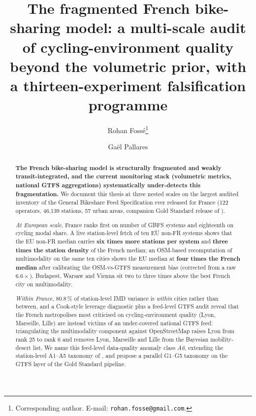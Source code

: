 \documentclass[11pt,a4paper]{article}
\title{The fragmented French bike-sharing model:
       a multi-scale audit of cycling-environment quality
       beyond the volumetric prior, with a thirteen-experiment
       falsification programme}
\author[1]{Rohan Foss\'e\thanks{Corresponding author. E-mail:
            \texttt{rohan.fosse@gmail.com}.}}
\author[1]{Ga\"el Pallares}
\affil[1]{CESI LINEACT, BikeShare-ICT research programme,
          Montpellier, France}
\date{}
\begin{document}
\maketitle

\begin{abstract}
\noindent
\textbf{The French bike-sharing model is structurally fragmented
and weakly transit-integrated, and the current
monitoring stack (volumetric metrics, national GTFS aggregations)
systematically under-detects this fragmentation.} We document
this thesis at three nested scales on the largest audited
inventory of the General Bikeshare Feed Specification ever
released for France (122 operators, 46{,}139 stations, 57 urban
areas, companion Gold Standard release of
\citet{Fosse2026gold}).

\emph{At European scale}, France ranks first on number of GBFS
systems and eighteenth on cycling modal share. A live
station-level fetch of ten EU non-FR systems shows that the EU
non-FR median carries \textbf{six times more stations per system}
and \textbf{three times the station density} of the French
median; an OSM-based recomputation of multimodality on the same
ten cities shows the EU median at \textbf{four times the French
median} after calibrating the OSM-vs-GTFS measurement bias
(corrected from a raw $6.6 \times$). Budapest, Warsaw and Vienna
sit two to three times above the best French city on
multimodality.

\emph{Within France}, $80.8\,\%$ of station-level IMD variance is
\emph{within} cities rather than between, and a Cook-style
leverage diagnostic plus a feed-level GTFS audit reveal that the
French metropolises most criticised on cycling-environment
quality (Lyon, Marseille, Lille) are instead victims of an
under-covered national GTFS feed: triangulating the multimodality
component against OpenStreetMap raises Lyon from rank 25 to rank
6 and removes Lyon, Marseille and Lille from the Bayesian
mobility-desert list. We name this feed-level data-quality
anomaly class \emph{A6}, extending the station-level A1--A5
taxonomy of \citet{Fosse2026gold}, and propose a parallel
G1--G5 taxonomy on the GTFS layer of the Gold Standard pipeline.


\end{abstract}
\end{document}
